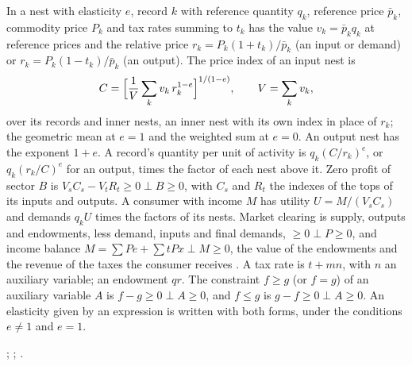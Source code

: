 In a nest with elasticity $e$, record $k$ with reference quantity $q_k$,
reference price $\bar p_k$, commodity price $P_k$ and tax rates summing to
$t_k$ has the value $v_k = \bar p_k q_k$ at reference prices and the
relative price $r_k = P_k (1 + t_k)/\bar p_k$ (an input or demand) or
$r_k = P_k (1 - t_k)/\bar p_k$ (an output). The price index of an input nest
is
\begin{equation*}
C = \Bigl[\frac{1}{V}\sum_k v_k\,r_k^{1-e}\Bigr]^{1/(1-e)}, \qquad V = \sum_k v_k,
\end{equation*}
over its records and inner nests, an inner nest with its own index in place
of $r_k$; the geometric mean at $e = 1$ and the weighted sum at $e = 0$. An
output nest has the exponent $1 + e$. A record's quantity per unit of
activity is $q_k (C/r_k)^{e}$, or $q_k (r_k/C)^{e}$ for an output, times the
factor of each nest above it. Zero profit of sector $B$ is
$V_s C_s - V_t R_t \ge 0 \perp B \ge 0$, with $C_s$ and $R_t$ the indexes of
the tops of its inputs and outputs. A consumer with income $M$ has utility
$U = M/(V_s C_s)$ and demands $q_k U$ times the factors of its nests. Market
clearing is supply, outputs and endowments, less demand, inputs and final
demands, $\ge 0 \perp P \ge 0$, and income balance $M = \sum P e + \sum
t P x \perp M \ge 0$, the value of the endowments and the revenue of the
taxes the consumer receives \citep{mathiesen1985, rutherford1999}. A tax
rate is $t + m n$, with $n$ an auxiliary variable; an endowment $q r$. The
constraint $f \ge g$ (or $f = g$) of an auxiliary variable $A$ is
$f - g \ge 0 \perp A \ge 0$, and $f \le g$ is $g - f \ge 0 \perp A \ge 0$. An
elasticity given by an expression is written with both forms, under the
conditions \cmd{$(}$e \ne 1$\cmd{)} and \cmd{$(}$e = 1$\cmd{)}.


\citet{mathiesen1985}; \citet{rutherford1995}; \citet{rutherford1999}.


\begin{alsosee}
\end{alsosee}
